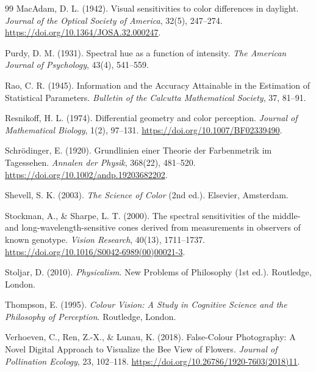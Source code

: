 \documentclass[preprint,12pt,authoryear]{elsarticle}
\theoremstyle{plain}
\theoremstyle{definition}
\theoremstyle{remark}
\begin{document}
\begin{thebibliography}{99}
MacAdam, D. L. (1942). Visual sensitivities to color differences in daylight. \textit{Journal of the Optical Society of America}, 32(5), 247--274. \url{https://doi.org/10.1364/JOSA.32.000247}.

Purdy, D. M. (1931). Spectral hue as a function of intensity. \textit{The American Journal of Psychology}, 43(4), 541--559.

Rao, C. R. (1945). Information and the Accuracy Attainable in the Estimation of Statistical Parameters. \textit{Bulletin of the Calcutta Mathematical Society}, 37, 81--91.

Resnikoff, H. L. (1974). Differential geometry and color perception. \textit{Journal of Mathematical Biology}, 1(2), 97--131. \url{https://doi.org/10.1007/BF02339490}.

Schr\"{o}dinger, E. (1920). Grundlinien einer Theorie der Farbenmetrik im Tagessehen. \textit{Annalen der Physik}, 368(22), 481--520. \url{https://doi.org/10.1002/andp.19203682202}.

Shevell, S. K. (2003). \textit{The Science of Color} (2nd ed.). Elsevier, Amsterdam.

Stockman, A., \& Sharpe, L. T. (2000). The spectral sensitivities of the middle- and long-wavelength-sensitive cones derived from measurements in observers of known genotype. \textit{Vision Research}, 40(13), 1711--1737. \url{https://doi.org/10.1016/S0042-6989(00)00021-3}.

Stoljar, D. (2010). \textit{Physicalism}. New Problems of Philosophy (1st ed.). Routledge, London.

Thompson, E. (1995). \textit{Colour Vision: A Study in Cognitive Science and the Philosophy of Perception}. Routledge, London.

Verhoeven, C., Ren, Z.-X., \& Lunau, K. (2018). False-Colour Photography: A Novel Digital Approach to Visualize the Bee View of Flowers. \textit{Journal of Pollination Ecology}, 23, 102--118. \url{https://doi.org/10.26786/1920-7603(2018)11}.

\end{thebibliography}
\end{document}
